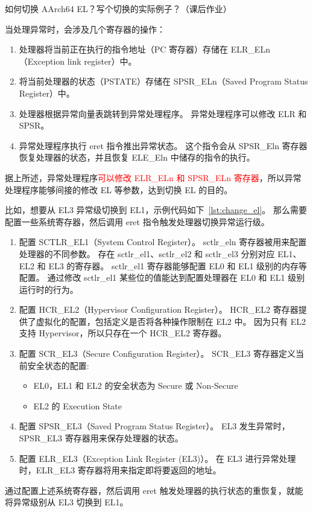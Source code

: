 \begin{probsolu}[title={Problem and Solution \theprob}]{
    如何切换 AArch64 EL？写个切换的实际例子？（课后作业）
  }\label{pb:el_changing}

  当处理异常时，会涉及几个寄存器的操作：
  \begin{enumerate}
    \item 处理器将当前正在执行的指令地址（PC 寄存器）存储在 ELR\_ELn（Exception link register）中。
    \item 将当前处理器的状态（PSTATE）存储在 SPSR\_ELn（Saved Program Status Register）中。
    \item 处理器根据异常向量表跳转到异常处理程序。
    异常处理程序可以修改 ELR 和 SPSR。
    \item 异常处理程序执行 eret 指令推出异常状态。
    这个指令会从 SPSR\_Eln 寄存器恢复处理器的状态，并且恢复 ELE\_Eln 中储存的指令的执行。
  \end{enumerate}
  据上所述，异常处理程序\textcolor{red}{可以修改 ELR\_ELn 和 SPSR\_ELn 寄存器}，所以异常处理程序能够间接的修改 EL 等参数，达到切换 EL 的目的。

  比如，想要从 EL3 异常级切换到 EL1，示例代码如下~\ref{lst:change_el}。
  那么需要配置一些系统寄存器，然后调用 eret 指令触发处理器切换异常运行级。

  \begin{enumerate}
    \item 配置 SCTLR\_EL1（System Control Register）。
      sctlr\_eln 寄存器被用来配置处理器的不同参数。
      存在 sctlr\_el1、sctlr\_el2 和 sctlr\_el3 分别对应 EL1、EL2 和 EL3 的寄存器。
      sctlr\_el1 寄存器能够配置 EL0 和 EL1 级别的内存等配置。
      通过修改 sctlr\_el1 某些位的值能达到配置处理器在 EL0 和 EL1 级别运行时的行为。
    \item 配置 HCR\_EL2（Hypervisor Configuration Register）。
      HCR\_EL2 寄存器提供了虚拟化的配置，包括定义是否将各种操作限制在 EL2 中。
      因为只有 EL2 支持 Hypervisor，所以只存在一个 HCR\_EL2 寄存器。
    \item 配置 SCR\_EL3（Secure Configuration Register）。
      SCR\_EL3 寄存器定义当前安全状态的配置:
      \begin{itemize}
        \item EL0，EL1 和 EL2 的安全状态为 Secure 或 Non-Secure
        \item EL2 的 Execution State
      \end{itemize}
    \item 配置 SPSR\_EL3（Saved Program Status Register）。
      EL3 发生异常时，SPSR\_EL3 寄存器用来保存处理器的状态。
    \item 配置 ELR\_EL3（Exception Link Register (EL3)）。
      在 EL3 进行异常处理时，ELR\_EL3 寄存器将用来指定即将要返回的地址。
  \end{enumerate}
  通过配置上述系统寄存器，然后调用 eret 触发处理器的执行状态的重恢复，就能将异常级别从 EL3 切换到 EL1。
\end{probsolu}
